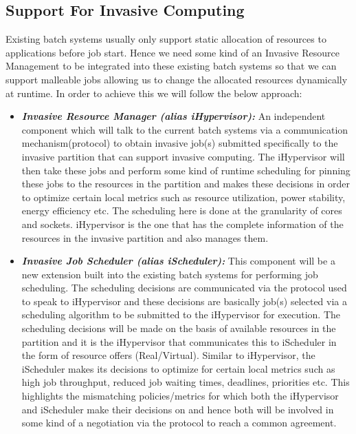\documentclass[a4paper, 12pt]{article}
\begin{document}
\subsection{Support For Invasive Computing}
Existing batch systems usually only support static allocation of resources to applications before job start. Hence we need some kind of an Invasive Resource Management to be integrated into these existing batch systems so that we can support malleable jobs allowing us to change the allocated resources dynamically at runtime. In order to achieve this we will follow the below approach:
\begin{itemize}
\item \textbf{\textit{Invasive Resource Manager (alias iHypervisor):}} An independent component which will talk to the current batch systems via a communication mechanism(protocol) to obtain invasive job(s) submitted specifically to the invasive partition that can support invasive computing. The iHypervisor will then take these jobs and perform some kind of runtime scheduling for pinning these jobs to the resources in the partition and makes these decisions in order to optimize certain local metrics such as resource utilization, power stability, energy efficiency etc. The scheduling here is done at the granularity of cores and sockets. iHypervisor is the one that has the complete information of the resources in the invasive partition and also manages them.
\item \textbf{\textit{Invasive Job Scheduler (alias iScheduler):}} This component will be a new extension built into the existing batch systems for performing job scheduling. The scheduling decisions are communicated via the protocol used to speak to iHypervisor and these decisions are basically job(s) selected via a scheduling algorithm to be submitted to the iHypervisor for execution. The scheduling decisions will be made on the basis of available resources in the partition and it is the iHypervisor that communicates this to iScheduler in the form of resource offers (Real/Virtual). Similar to iHypervisor, the iScheduler makes its decisions to optimize for certain local metrics such as high job throughput, reduced job waiting times, deadlines, priorities etc. This highlights the mismatching policies/metrics for which both the iHypervisor and iScheduler make their decisions on and hence both will be involved in some kind of a negotiation via the protocol to reach a common agreement.

\end{itemize}
\end{document}
